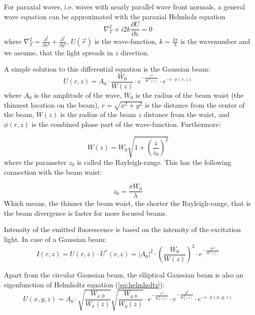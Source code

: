      For paraxial waves, i.e. waves with nearly parallel wave front normals, a general wave equation can be approximated with the paraxial Helmholz equation \cite{krzic_multiple-view_2009, saleh_fundamentals_2007}
      \begin{equation}
        \nabla_T^2 + i 2k \frac{\partial U}{\partial z} = 0
        \label{eq:helmholtz}
      \end{equation}
      where $\nabla_T^2 = \frac{\partial^2}{\partial x^2} + \frac{\partial^2}{\partial y^2}$, $U(\vec{r})$ is the wave-function, $k=\frac{2\pi}{\lambda}$ is the wavenumber and we assume, that the light spreads in $z$ direction.
      
      A simple solution to this differential equation is the Gaussian beam:
      \begin{equation}
        U(r,z) = A_0 \cdot \frac{W_0}{W(z)} \cdot e^{-\frac{r^2}{W^2(z)}}\cdot e^{-i\cdot \phi(r,z)}
      \label{eq:gaussian}
      \end{equation}
      where $A_0$ is the amplitude of the wave, $W_0$ is the radius of the beam waist (the thinnest location on the beam), $r=\sqrt{x^2+y^2}$ is the distance from the center of the beam, $W(z)$ is the radius of the beam $z$ distance from the waist, and $\phi(r,z)$ is the combined phase part of the wave-function. Furthermore:

      \begin{equation}
        W(z) = W_0\sqrt{1+\left( \frac{z}{z_0} \right)^2}
      \end{equation}
      where the parameter $z_0$ is called the Rayleigh-range. This has the following connection with the beam waist:

      \begin{equation}
        z_0 = \frac{\pi W_0}{\lambda}
      \end{equation}
      Which means, the thinner the beam waist, the shorter the Rayleigh-range, that is the beam divergence is faster for more focused beams.

      Intensity of the emitted fluorescence is based on the intensity of the excitation light. In case of a Gaussian beam:
      \begin{equation}
        I(r,z) = U(r,z)\cdot U^*(r,z) = |A_0|^2 \cdot \left( \frac{W_0}{W(z)}\right)^2 \cdot e^{-\frac{2r^2}{W^2(z)}}
      \end{equation}

      Apart from the circular Gaussian beam, the elliptical Gaussian beam is also an eigenfunction of Helmholtz equation (\ref{eq:helmholtz}):
      \begin{equation}
        U(x,y,z) = A_0 \cdot \sqrt{\frac{W_{x,0}}{W_x(z)}} \sqrt{\frac{W_{y,0}}{W_y(z)}} \cdot e^{-\frac{x^2}{W_x^2(z)}} \cdot e^{-\frac{y^2}{W_y^2(z)}} \cdot e^{-i\cdot \phi(x,y,z)}
      \end{equation}

